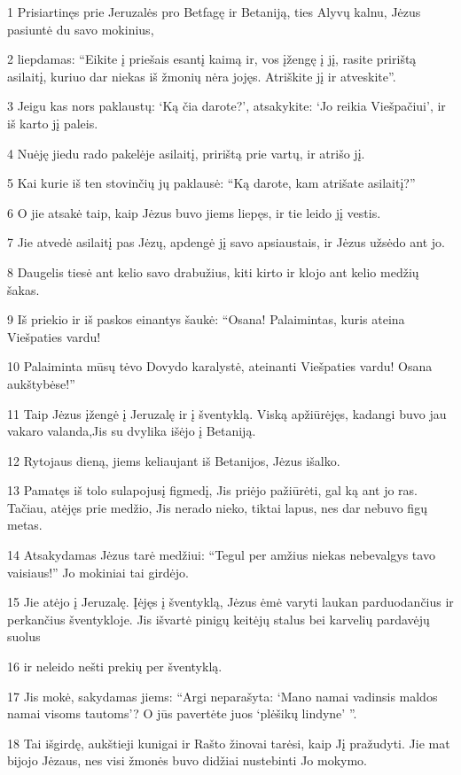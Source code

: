 \par 1 Prisiartinęs prie Jeruzalės pro Betfagę ir Betaniją, ties Alyvų kalnu, Jėzus pasiuntė du savo mokinius, 
\par 2 liepdamas: “Eikite į priešais esantį kaimą ir, vos įžengę į jį, rasite pririštą asilaitį, kuriuo dar niekas iš žmonių nėra jojęs. Atriškite jį ir atveskite”. 
\par 3 Jeigu kas nors paklaustų: ‘Ką čia darote?’, atsakykite: ‘Jo reikia Viešpačiui’, ir iš karto jį paleis. 
\par 4 Nuėję jiedu rado pakelėje asilaitį, pririštą prie vartų, ir atrišo jį. 
\par 5 Kai kurie iš ten stovinčių jų paklausė: “Ką darote, kam atrišate asilaitį?” 
\par 6 O jie atsakė taip, kaip Jėzus buvo jiems liepęs, ir tie leido jį vestis. 
\par 7 Jie atvedė asilaitį pas Jėzų, apdengė jį savo apsiaustais, ir Jėzus užsėdo ant jo. 
\par 8 Daugelis tiesė ant kelio savo drabužius, kiti kirto ir klojo ant kelio medžių šakas. 
\par 9 Iš priekio ir iš paskos einantys šaukė: “Osana! Palaimintas, kuris ateina Viešpaties vardu! 
\par 10 Palaiminta mūsų tėvo Dovydo karalystė, ateinanti Viešpaties vardu! Osana aukštybėse!” 
\par 11 Taip Jėzus įžengė į Jeruzalę ir į šventyklą. Viską apžiūrėjęs,­ kadangi buvo jau vakaro valanda,­Jis su dvylika išėjo į Betaniją. 
\par 12 Rytojaus dieną, jiems keliaujant iš Betanijos, Jėzus išalko. 
\par 13 Pamatęs iš tolo sulapojusį figmedį, Jis priėjo pažiūrėti, gal ką ant jo ras. Tačiau, atėjęs prie medžio, Jis nerado nieko, tiktai lapus, nes dar nebuvo figų metas. 
\par 14 Atsakydamas Jėzus tarė medžiui: “Tegul per amžius niekas nebevalgys tavo vaisiaus!” Jo mokiniai tai girdėjo. 
\par 15 Jie atėjo į Jeruzalę. Įėjęs į šventyklą, Jėzus ėmė varyti laukan parduodančius ir perkančius šventykloje. Jis išvartė pinigų keitėjų stalus bei karvelių pardavėjų suolus 
\par 16 ir neleido nešti prekių per šventyklą. 
\par 17 Jis mokė, sakydamas jiems: “Argi neparašyta: ‘Mano namai vadinsis maldos namai visoms tautoms’? O jūs pavertėte juos ‘plėšikų lindyne’ ”. 
\par 18 Tai išgirdę, aukštieji kunigai ir Rašto žinovai tarėsi, kaip Jį pražudyti. Jie mat bijojo Jėzaus, nes visi žmonės buvo didžiai nustebinti Jo mokymo. 
